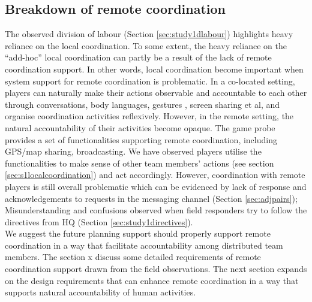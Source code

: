 \subsection{Breakdown of remote coordination}\label{sec:study1breakdown}
The observed division of labour (Section \ref{sec:study1dlabour}) highlights heavy reliance on the local coordination. To some extent, the heavy reliance on the ``add-hoc'' local coordination can partly be a result of the lack of remote coordination support. In other words, local coordination become important when system support for remote coordination is problematic. In a co-located setting, players can naturally make their actions observable and accountable to each other through conversations, body languages, gestures , screen sharing et al, and organise coordination activities reflexively. However, in the remote setting, the natural accountability of their activities become opaque. The game probe provides a set of functionalities supporting remote coordination, including GPS/map sharing, broadcasting. We have observed players utilise the functionalities to make sense of other team members' actions (see section \ref{sec:s1localcoordination}) and act accordingly. However, coordination with remote players is still overall problematic which can be evidenced by lack of response and acknowledgements to requests in the messaging channel (Section \ref{sec:adjpairs}); Misunderstanding and confusions observed when field responders try to follow the directives from HQ (Section \ref{sec:study1directives}).\\

We suggest the future planning support should properly support remote coordination in a way that facilitate accountability among distributed team members. The section x discuss some detailed requirements of remote coordination support drawn from the field observations. The next section expands on the design requirements that can enhance remote coordination in a way that supports natural accountability of human activities.\\


